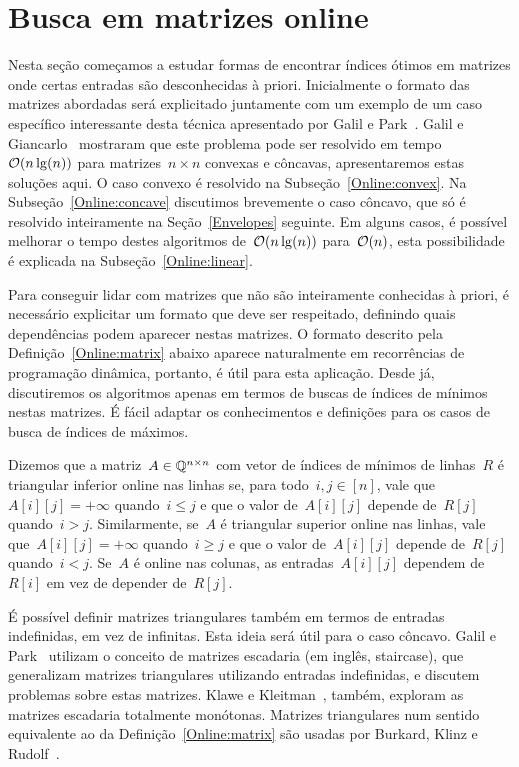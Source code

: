\section{Busca em matrizes online}
\label{Online}

Nesta seção começamos a estudar formas de encontrar índices ótimos em matrizes onde certas entradas são desconhecidas à priori. Inicialmente o formato das matrizes abordadas será explicitado juntamente com um exemplo de um caso específico interessante desta técnica apresentado por Galil e Park~\cite{Galil:1992}. Galil e Giancarlo~\cite{Galil:1989} mostraram que este problema pode ser resolvido em tempo~$\mathcal{O}(n\lg(n))$ para matrizes~$n \times n$ convexas e côncavas, apresentaremos estas soluções aqui. O caso convexo é resolvido na Subseção~\ref{Online:convex}. Na Subseção~\ref{Online:concave} discutimos brevemente o caso côncavo, que só é resolvido inteiramente na Seção~\ref{Envelopes} seguinte. Em alguns casos, é possível melhorar o tempo destes algoritmos de~$\mathcal{O}(n\lg(n))$ para~$\mathcal{O}(n)$, esta possibilidade é explicada na Subseção~\ref{Online:linear}.

Para conseguir lidar com matrizes que não são inteiramente conhecidas à priori, é necessário explicitar um formato que deve ser respeitado, definindo quais dependências podem aparecer nestas matrizes. O formato descrito pela Definição~\ref{Online:matrix} abaixo aparece naturalmente em recorrências de programação dinâmica, portanto, é útil para esta aplicação. Desde já, discutiremos os algoritmos apenas em termos de buscas de índices de mínimos nestas matrizes. É fácil adaptar os conhecimentos e definições para os casos de busca de índices de máximos.

\begin{defi} \label{Online:matrix}
Dizemos que a matriz~$A \in \mathbb{Q}^{n \times n}$ com vetor de índices de mínimos de linhas~$R$ é triangular inferior online nas linhas se, para todo~${ i,j \in [n] }$, vale que~${ A[i][j] = +\infty }$ quando~${ i \leq j }$ e que o valor de~$A[i][j]$ depende de~$R[j]$ quando~${ i > j }$. Similarmente, se~$A$ é triangular superior online nas linhas, vale que~${ A[i][j] = +\infty }$ quando~${ i \geq j }$ e que o valor de~$A[i][j]$ depende de~$R[j]$ quando~${ i < j}$. Se~$A$ é online nas colunas, as entradas~$A[i][j]$ dependem de~$R[i]$ em vez de depender de~$R[j]$.
\end{defi}

É possível definir matrizes triangulares também em termos de entradas indefinidas, em vez de infinitas. Esta ideia será útil para o caso côncavo. Galil e Park~\cite{Galil:1992} utilizam o conceito de matrizes escadaria (em inglês, staircase), que generalizam matrizes triangulares utilizando entradas indefinidas, e discutem problemas sobre estas matrizes. Klawe e Kleitman~\cite{Klawe:1990}, também, exploram as matrizes escadaria totalmente monótonas. Matrizes triangulares num sentido equivalente ao da Definição~\ref{Online:matrix} são usadas por Burkard, Klinz e Rudolf~\cite[Seções 2.1 e 3.8]{Burkard:1996}.

